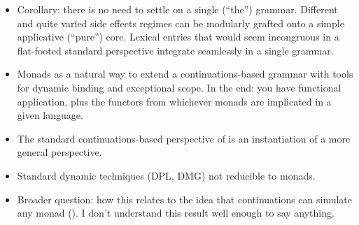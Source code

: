 \begin{itemize}
	\item Corollary: there is no need to settle on a single (``the'') grammar. Different and quite varied side effects regimes can be modularly grafted onto a simple applicative (``pure'') core. Lexical entries that would seem incongruous in a flat-footed standard perspective integrate seamlessly in a single grammar. %
	
	\item Monads as a natural way to extend a continuations-based grammar with tools for dynamic binding and exceptional scope. In the end: you have functional application, plus the functors from whichever monads are implicated in a given language. %
	
	\item The standard continuations-based perspective of \citealt{Barker:2002, ShanBarker:2006, BarkerShan:2014} is an instantiation of a more general perspective.%
	
	\item Standard dynamic techniques (DPL, DMG) not reducible to monads. 
	
	\item Broader question: how this relates to the idea that continuations can simulate any monad (\citealt{Filinski:1994}). I don't understand this result well enough to say anything. %
\end{itemize}

